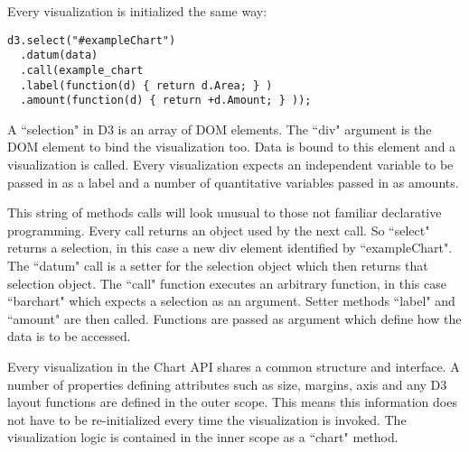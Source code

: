 \documentclass[a4paper, 11pt, titlepage, onehalfspacing]{report}
\begin{document}
Every visualization is initialized the same way:

\begin{verbatim}
d3.select("#exampleChart")
  .datum(data)
  .call(example_chart
  .label(function(d) { return d.Area; } )
  .amount(function(d) { return +d.Amount; } )); 
\end{verbatim} 
\label{chart_usage}
A ``selection" in D3 is an array of DOM elements. The ``div" argument is the DOM element to bind the visualization too. Data is bound to this element and a visualization is called. Every visualization expects an independent variable to be passed in as a label and a number of quantitative variables passed in as amounts.

This string of methods calls will look unusual to those not familiar declarative programming. Every call returns an object used by the next call. So ``select" returns a selection, in this case a new div element identified by ``exampleChart". The ``datum" call is a setter for the selection object which then returns that selection object. The ``call" function executes an arbitrary function, in this case ``barchart" which expects a selection as an argument. Setter methods ``label" and ``amount" are then called. Functions are passed as argument which define how the data is to be accessed.

Every visualization in the Chart API shares a common structure and interface. A number of properties defining attributes such as size, margins, axis and any D3 layout functions are defined in the outer scope. This means this information does not have to be re-initialized every time the visualization is invoked. The visualization logic is contained in the inner scope as a ``chart" method. 
\end{document}
